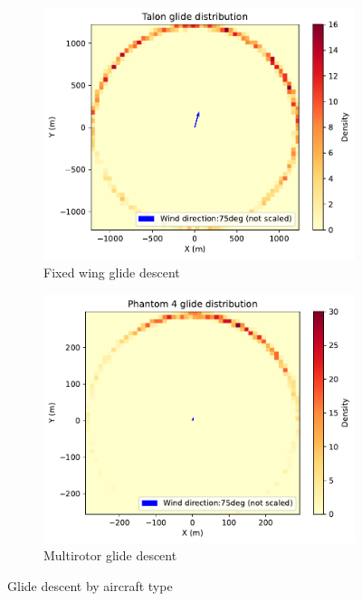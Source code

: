 \documentclass[12pt]{report}
\begin{document}
        \begin{figure}[H]
            \centering
            \begin{subfigure}[b]{0.45\textwidth}
                \centering
                \includegraphics[width=\textwidth]{Plot/talon/Talon glide distribution.pdf}
                \caption{Fixed wing glide descent}
                \label{fig:fixed_wing}
            \end{subfigure}
            \hfill
            \begin{subfigure}[b]{0.45\textwidth}
                \centering
                \includegraphics[width=\textwidth]{Plot/phantom4/Phantom 4 glide distribution.pdf}
                \caption{Multirotor glide descent}
                \label{fig:multirotor}
            \end{subfigure}
            \caption{Glide descent by aircraft type}
            \label{fig:ballistic_descent}
        \end{figure}
\end{document}
